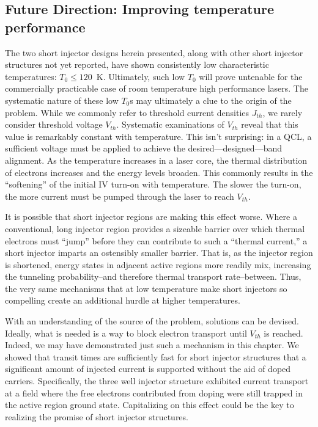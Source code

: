 \subsection{Future Direction: Improving temperature performance}

The two short injector designs herein presented, along with other short injector structures not yet reported, have shown consistently low characteristic temperatures: $T_0\leq120$~K.  Ultimately, such low $T_0$ will prove untenable for the commercially practicable case of room temperature high performance lasers.  The systematic nature of these low $T_0$s may ultimately a clue to the origin of the problem.  While we commonly refer to threshold current densities $J_{th}$, we rarely consider threshold voltage $V_{th}$.  Systematic examinations of $V_{th}$ reveal that this value is remarkably constant with temperature.  This isn't surprising: in a QCL, a sufficient voltage must be applied to achieve the desired---designed---band alignment.  As the temperature increases in a laser core, the thermal distribution of electrons increases and the energy levels broaden.  This commonly results in the ``softening'' of the initial IV turn-on with temperature.  The slower the turn-on, the more current must be pumped through the laser to reach $V_{th}$.

It is possible that short injector regions are making this effect worse.  Where a conventional, long injector region provides a sizeable barrier over which thermal electrons must ``jump'' before they can contribute to such a ``thermal current,'' a short injector imparts an ostensibly smaller barrier.  That is, as the injector region is shortened, energy states in adjacent active regions more readily mix, increasing the tunneling probability--and therefore thermal transport rate--between.  Thus, the very same mechanisms that at low temperature make short injectors so compelling create an additional hurdle at higher temperatures.

With an understanding of the source of the problem, solutions can be devised.  Ideally, what is needed is a way to block electron transport until $V_{th}$ is reached.  Indeed, we may have demonstrated just such a mechanism in this chapter.  We showed that transit times are sufficiently fast for short injector structures that a significant amount of injected current is supported without the aid of doped carriers.  Specifically, the three well injector structure exhibited current transport at a field where the free electrons contributed from doping were still trapped in the active region ground state.  Capitalizing on this effect could be the key to realizing the promise of short injector structures.



%
%
% 